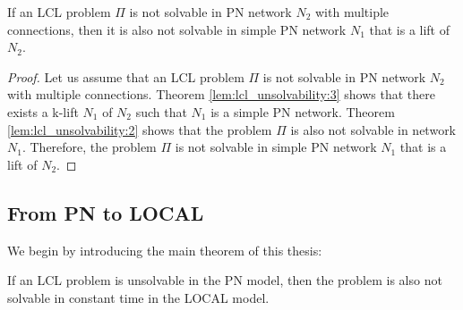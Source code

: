 

%
\begin{lemma} \label{lem:lcl_unsolvability:4}
    If an LCL problem $\Pi$ is not solvable in PN network $N_2$ with multiple connections, then it is also not solvable in simple PN network $N_1$ that is a lift of $N_2$.
\end{lemma}
\begin{proof}
    Let us assume that an LCL problem $\Pi$ is not solvable in PN network $N_2$ with multiple connections.
    Theorem \ref{lem:lcl_unsolvability:3} shows that there exists a k-lift $N_1$ of $N_2$ such that $N_1$ is a simple PN network.
    Theorem \ref{lem:lcl_unsolvability:2} shows that the problem $\Pi$ is also not solvable in network $N_1$.
    Therefore, the problem $\Pi$ is not solvable in simple PN network $N_1$ that is a lift of $N_2$.
\end{proof}

\subsection{From PN to LOCAL} \label{sec:algorithm:from_pn_to_local}

We begin by introducing the main theorem of this thesis:

\begin{theorem} \label{thm:lcl_unsolvability}
    If an LCL problem is unsolvable in the PN model, then the problem is also not solvable in constant time in the LOCAL model.
\end{theorem}

